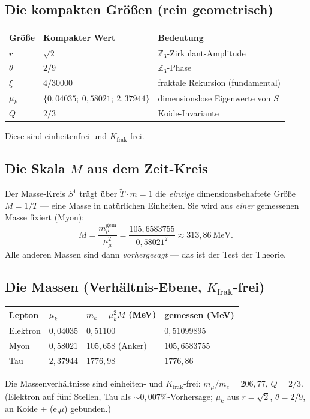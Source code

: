 \subsection{Die kompakten Gr\"o\ss en (rein geometrisch)}
\begin{center}
\begin{tabular}{@{}p{1.7cm} p{3.4cm} p{6.4cm}@{}}
\toprule
Gr\"o\ss e & Kompakter Wert & Bedeutung \\
\midrule
$r$ & $\sqrt2$ & $\mathbb{Z}_3$-Zirkulant-Amplitude \\
$\theta$ & $2/9$ & $\mathbb{Z}_3$-Phase \\
$\xi$ & $4/30000$ & fraktale Rekursion (fundamental) \\
$\mu_k$ & $\{0{,}04035;\ 0{,}58021;\ 2{,}37944\}$ & dimensionslose Eigenwerte von $S$ \\
$Q$ & $2/3$ & Koide-Invariante \\
\bottomrule
\end{tabular}
\end{center}
Diese sind einheitenfrei und $K_{\text{frak}}$-frei.

\subsection{Die Skala $M$ aus dem Zeit-Kreis}
Der Masse-Kreis $S^1$ tr\"agt \"uber $\tilde{T}\cdot m=1$ die \emph{einzige} dimensionsbehaftete
Gr\"o\ss e $M=1/T$ --- eine Masse in nat\"urlichen Einheiten. Sie wird aus \emph{einer} gemessenen
Masse fixiert (Myon):
\[
M=\frac{m_\mu^{\text{gem}}}{\mu_\mu^2}=\frac{105{,}6583755}{0{,}58021^2}\approx 313{,}86\ \text{MeV}.
\]
Alle anderen Massen sind dann \emph{vorhergesagt} --- das ist der Test der Theorie.

\subsection{Die Massen (Verh\"altnis-Ebene, $K_{\text{frak}}$-frei)}
\begin{center}
\begin{tabular}{@{}p{2.2cm} p{1.9cm} p{3.4cm} p{3.4cm}@{}}
\toprule
Lepton & $\mu_k$ & $m_k=\mu_k^2 M$ (MeV) & gemessen (MeV) \\
\midrule
Elektron & $0{,}04035$ & $0{,}51100$ & $0{,}51099895$ \\
Myon & $0{,}58021$ & $105{,}658$ (Anker) & $105{,}6583755$ \\
Tau & $2{,}37944$ & $1776{,}98$ & $1776{,}86$ \\
\bottomrule
\end{tabular}
\end{center}
Die Massenverh\"altnisse sind einheiten- und $K_{\text{frak}}$-frei: $m_\mu/m_e=206{,}77$,
$Q=2/3$. (Elektron auf f\"unf Stellen, Tau als $\sim0{,}007\%$-Vorhersage; $\mu_k$ aus $r=\sqrt2$,
$\theta=2/9$, an Koide + (e,$\mu$) gebunden.)

